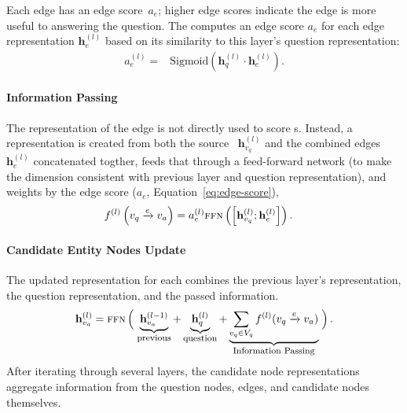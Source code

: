 Each edge has an edge score~$a_e$; higher edge scores indicate the
edge is more useful to answering the question.
%
The  computes an edge score $a_e$ for each edge
representation $\mathbf{h}_e^{(l)}$ based on its similarity to this
layer's question representation:
\begin{align}
    a^{(l)}_e = & \text{Sigmoid}\left(\mathbf{h}_q^{(l)} \cdot \mathbf{h}_e^{(l)}\right).
\label{eq:edge-score}
\end{align}

\paragraph{Information Passing}

The representation of the edge is not directly used to score
\rightnode{}s.
%
Instead, a representation is created from both the
source \leftnode{}~$\mathbf{h}_{v_q}^{(l)}$ and the combined
edges~$\mathbf{h}_e^{(l)}$ concatenated togther, feeds that through a
feed-forward network (to make the dimension consistent with previous layer and question representation), and weights by the edge score ($a_e$,
Equation~\ref{eq:edge-score}),
\begin{align}
f^{(l)}\left(v_q\xrightarrow{e} v_a\right)&= a_e^{(l)} \mbox{\textsc{ffn}}\left(\left[\mathbf{h}_{v_q}^{(l)};\mathbf{h}_e^{(l)}\right]\right).
\end{align}


\paragraph{Candidate Entity Nodes Update}

The updated representation for each \rightnode{} 
combines the previous layer's \rightnode{} representation, the question
representation, and the passed information. 
\begin{equation}
  \mathbf{h}_{v_a}^{(l)}= \text{\abr{ffn}}
   \left( \vphantom{\mathbf{h}_{v_a}^{(l-1)}} \right.
  \explain{previous}{\mathbf{h}_{v_a}^{(l-1)}}
                           + \explain{question}{\mathbf{h}_q^{(l)}} +
                           \explain{Information Passing}{\sum_{v_q \in V_q} f^{(l)}(v_q\xrightarrow{e} v_a)}
                              \left. \vphantom{\mathbf{h}_{v_a}^{(l-1)}} \right).
                         \end{equation}
After iterating through several  layers, the candidate node
representations aggregate information from the question nodes, edges,
and candidate nodes themselves.

